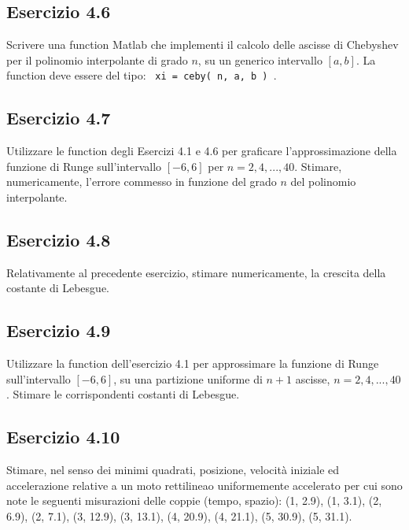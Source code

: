 	\subsection {Esercizio 4.6}
Scrivere una function Matlab che implementi il calcolo delle ascisse di Chebyshev per il polinomio interpolante di grado $n$, su un generico intervallo $[a,b]$. La function deve essere del tipo: \texttt { xi = ceby( n, a, b ) }.

	\subsection {Esercizio 4.7}
Utilizzare le function degli Esercizi 4.1 e 4.6 per graficare l'approssimazione della funzione di Runge sull'intervallo $[-6,6]$ per $n= 2,4, ... ,40$. Stimare, numericamente, l'errore commesso in funzione del grado $n$ del polinomio interpolante.

	\subsection {Esercizio 4.8}
Relativamente al precedente esercizio, stimare numericamente, la crescita della costante di Lebesgue.

	\subsection {Esercizio 4.9}
Utilizzare la function dell'esercizio 4.1 per approssimare la funzione di Runge sull'intervallo $[-6,6]$, su una partizione uniforme di $n+1$ ascisse, $n= 2,4, ... ,40$. Stimare le corrispondenti costanti di Lebesgue.

	\subsection {Esercizio 4.10}
Stimare, nel senso dei minimi quadrati, posizione, velocità iniziale ed accelerazione relative a un moto rettilineao uniformemente accelerato per cui sono note le seguenti misurazioni delle coppie (tempo, spazio): (1, 2.9), (1, 3.1), (2, 6.9), (2, 7.1), (3, 12.9), (3, 13.1), (4, 20.9), (4, 21.1), (5, 30.9), (5, 31.1).